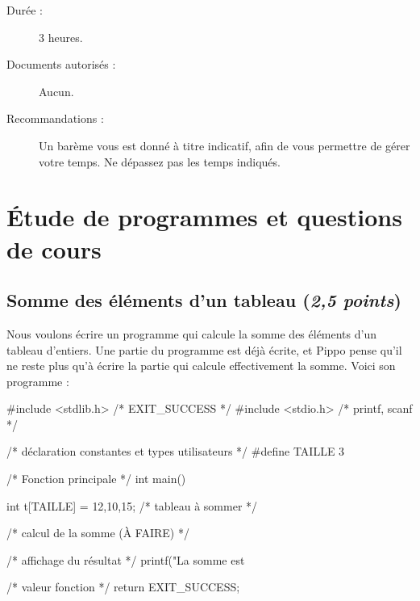 

\setcounter{questioncount}{0}
\newcommand{\question}{\addtocounter{questioncount}{1}\paragraph{Question \Alph{questioncount}.}}
\newcommand{\commentaire}[1]{}
\newcommand{\pt}[1]{\fbox{$#1 \operatorname{pt}$}}

\vspace{-1cm}
\begin{description}
\item[Durée :] 3 heures.
\item[Documents autorisés :] Aucun.
\item[Recommandations :] Un barème vous est donné à
titre indicatif, afin de vous permettre de gérer votre temps. Ne
dépassez pas les temps indiqués.
\end{description}

\section{Étude de programmes et questions de cours}

\subsection{Somme des éléments d'un tableau (\emph{2,5 points})}

Nous voulons écrire un programme qui calcule la somme des éléments
d'un tableau d'entiers. Une partie du programme est déjà écrite, et
Pippo pense qu'il ne
reste plus qu'à écrire la partie qui calcule effectivement la
somme. Voici son programme :
\begin{listing}{1}
#include <stdlib.h> /* EXIT_SUCCESS */
#include <stdio.h> /* printf, scanf */

/* déclaration constantes et types utilisateurs */
#define TAILLE 3

/* Fonction principale */
int main()
{
  int t[TAILLE] = {12,10,15}; /* tableau à sommer */



  /* calcul de la somme (À FAIRE) */





  /* affichage du résultat */
  printf("La somme est %

  /* valeur fonction */
  return EXIT_SUCCESS;
}
\end{listing}

